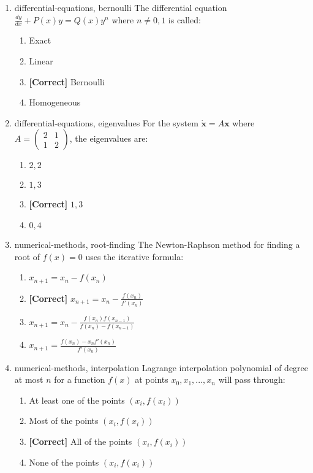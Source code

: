 \documentclass{article}
\newenvironment{problem}{\item}{}
\newcommand{\choice}{\item}
\newcommand{\correctchoice}{\item \textbf{[Correct] }}
\newcommand{\tags}[1]{#1} %
\begin{document}
\begin{enumerate}
        \begin{problem}
            \tags{differential-equations, bernoulli}
            The differential equation $\frac{dy}{dx} + P(x)y = Q(x)y^n$ where $n \neq 0, 1$ is called:
            \begin{enumerate}
                \choice Exact
                \choice Linear
                \correctchoice Bernoulli
                \choice Homogeneous
            \end{enumerate}
        \end{problem}
        
        \begin{problem}
            \tags{differential-equations, eigenvalues}
            For the system $\dot{\mathbf{x}} = A\mathbf{x}$ where $A = \begin{pmatrix} 2 & 1 \\ 1 & 2 \end{pmatrix}$, the eigenvalues are:
            \begin{enumerate}
                \choice $2, 2$
                \choice $1, 3$
                \correctchoice $1, 3$
                \choice $0, 4$
            \end{enumerate}
        \end{problem}

        \begin{problem}
            \tags{numerical-methods, root-finding}
            The Newton-Raphson method for finding a root of $f(x) = 0$ uses the iterative formula:
            \begin{enumerate}
                \choice $x_{n+1} = x_n - f(x_n)$
                \correctchoice $x_{n+1} = x_n - \frac{f(x_n)}{f'(x_n)}$
                \choice $x_{n+1} = x_n - \frac{f(x_n)f(x_{n-1})}{f(x_n)-f(x_{n-1})}$
                \choice $x_{n+1} = \frac{f(x_n)-x_nf'(x_n)}{f'(x_n)}$
            \end{enumerate}
        \end{problem}
        
        \begin{problem}
            \tags{numerical-methods, interpolation}
            Lagrange interpolation polynomial of degree at most $n$ for a function $f(x)$ at points $x_0, x_1, ..., x_n$ will pass through:
            \begin{enumerate}
                \choice At least one of the points $(x_i, f(x_i))$
                \choice Most of the points $(x_i, f(x_i))$
                \correctchoice All of the points $(x_i, f(x_i))$
                \choice None of the points $(x_i, f(x_i))$
            \end{enumerate}
        \end{problem}
        

\end{enumerate}
\end{document}
